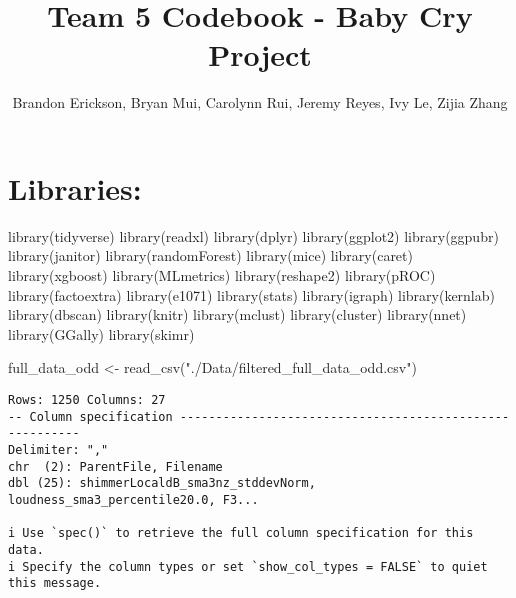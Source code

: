 \documentclass[
  letterpaper,
  DIV=11,
  numbers=noendperiod]{scrartcl}
\title{Team 5 Codebook - Baby Cry Project}
\author{Brandon Erickson, Bryan Mui, Carolynn Rui, Jeremy Reyes, Ivy Le,
Zijia Zhang}
\date{}
\newenvironment{Shaded}{\begin{snugshade}}{\end{snugshade}}
\newcommand{\FunctionTok}[1]{\textcolor[rgb]{0.28,0.35,0.67}{#1}}
\newcommand{\NormalTok}[1]{\textcolor[rgb]{0.00,0.23,0.31}{#1}}
\newcommand{\OtherTok}[1]{\textcolor[rgb]{0.00,0.23,0.31}{#1}}
\newcommand{\StringTok}[1]{\textcolor[rgb]{0.13,0.47,0.30}{#1}}
\begin{document}
\maketitle


\section{Libraries:}\label{libraries}

\begin{Shaded}
\begin{Highlighting}[]
\FunctionTok{library}\NormalTok{(tidyverse)}
\FunctionTok{library}\NormalTok{(readxl)}
\FunctionTok{library}\NormalTok{(dplyr)}
\FunctionTok{library}\NormalTok{(ggplot2)}
\FunctionTok{library}\NormalTok{(ggpubr)}
\FunctionTok{library}\NormalTok{(janitor)}
\FunctionTok{library}\NormalTok{(randomForest)}
\FunctionTok{library}\NormalTok{(mice)}
\FunctionTok{library}\NormalTok{(caret)}
\FunctionTok{library}\NormalTok{(xgboost)}
\FunctionTok{library}\NormalTok{(MLmetrics)}
\FunctionTok{library}\NormalTok{(reshape2)}
\FunctionTok{library}\NormalTok{(pROC)}
\FunctionTok{library}\NormalTok{(factoextra)}
\FunctionTok{library}\NormalTok{(e1071)}
\FunctionTok{library}\NormalTok{(stats)}
\FunctionTok{library}\NormalTok{(igraph)}
\FunctionTok{library}\NormalTok{(kernlab)}
\FunctionTok{library}\NormalTok{(dbscan)}
\FunctionTok{library}\NormalTok{(knitr)}
\FunctionTok{library}\NormalTok{(mclust)}
\FunctionTok{library}\NormalTok{(cluster)}
\FunctionTok{library}\NormalTok{(nnet)}
\FunctionTok{library}\NormalTok{(GGally)}
\FunctionTok{library}\NormalTok{(skimr)}
\end{Highlighting}
\end{Shaded}

\begin{Shaded}
\begin{Highlighting}[]
\NormalTok{full\_data\_odd }\OtherTok{\textless{}{-}} \FunctionTok{read\_csv}\NormalTok{(}\StringTok{"./Data/filtered\_full\_data\_odd.csv"}\NormalTok{)}
\end{Highlighting}
\end{Shaded}

\begin{verbatim}
Rows: 1250 Columns: 27
-- Column specification --------------------------------------------------------
Delimiter: ","
chr  (2): ParentFile, Filename
dbl (25): shimmerLocaldB_sma3nz_stddevNorm, loudness_sma3_percentile20.0, F3...

i Use `spec()` to retrieve the full column specification for this data.
i Specify the column types or set `show_col_types = FALSE` to quiet this message.
\end{verbatim}
\end{document}
